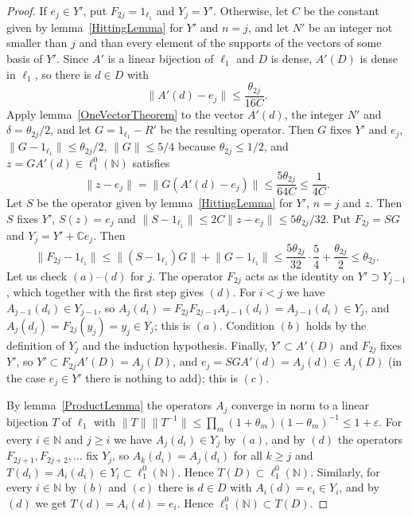 \documentclass[12pt]{article}
\newcommand{\lo}[1]{\ell_1^0(#1)}
\newcommand{\norm}[1]{\lVert #1\rVert}
\begin{document}
\begin{proof}
    If $e_j\in Y'$, put $F_{2j}=1_{\ell_1}$ and $Y_j=Y'$. Otherwise, let $C$
    be the constant given by lemma~\ref{HittingLemma} for $Y'$ and $n=j$, and
    let $N'$ be an integer not smaller than $j$ and than every element of the
    supports of the vectors of some basis of $Y'$. Since $A'$ is a linear
    bijection of $\ell_1$ and $D$ is dense, $A'(D)$ is dense in $\ell_1$, so
    there is $d\in D$ with
    \[
    \norm{A'(d)-e_j}\leq\frac{\theta_{2j}}{16C}.
    \]
    Apply lemma~\ref{OneVectorTheorem} to the vector $A'(d)$, the integer
    $N'$ and $\delta=\theta_{2j}/2$, and let $G=1_{\ell_1}-R'$ be the
    resulting operator. Then $G$ fixes $Y'$ and $e_j$,
    $\norm{G-1_{\ell_1}}\leq\theta_{2j}/2$, $\norm{G}\leq 5/4$ because
    $\theta_{2j}\leq 1/2$, and $z=GA'(d)\in\lo{\mathbb{N}}$ satisfies
    \[
    \norm{z-e_j}=\norm{G(A'(d)-e_j)}\leq\frac{5\theta_{2j}}{64C}\leq\frac{1}{4C}.
    \]
    Let $S$ be the operator given by lemma~\ref{HittingLemma} for $Y'$, $n=j$
    and $z$. Then $S$ fixes $Y'$, $S(z)=e_j$ and
    $\norm{S-1_{\ell_1}}\leq 2C\norm{z-e_j}\leq 5\theta_{2j}/32$. Put $F_{2j}=SG$
    and $Y_j=Y'+\mathbb{C}e_j$. Then
    \[
    \norm{F_{2j}-1_{\ell_1}}\leq\norm{(S-1_{\ell_1})G}+\norm{G-1_{\ell_1}}
    \leq\frac{5\theta_{2j}}{32}\cdot\frac54+\frac{\theta_{2j}}{2}
    \leq\theta_{2j}.
    \]
    Let us check $(a)$--$(d)$ for $j$. The operator $F_{2j}$ acts as the
    identity on $Y'\supset Y_{j-1}$, which together with the first step gives
    $(d)$. For $i<j$ we have $A_{j-1}(d_i)\in Y_{j-1}$, so
    $A_j(d_i)=F_{2j}F_{2j-1}A_{j-1}(d_i)=A_{j-1}(d_i)\in Y_j$, and
    $A_j(d_j)=F_{2j}(y_j)=y_j\in Y_j$; this is $(a)$. Condition $(b)$ holds
    by the definition of $Y_j$ and the induction hypothesis. Finally,
    $Y'\subset A'(D)$ and $F_{2j}$ fixes $Y'$, so $Y'\subset F_{2j}A'(D)=A_j(D)$,
    and $e_j=SGA'(d)=A_j(d)\in A_j(D)$ (in the case $e_j\in Y'$ there is
    nothing to add); this is $(c)$.

    By lemma~\ref{ProductLemma} the operators $A_j$ converge in norm to a
    linear bijection $T$ of $\ell_1$ with
    $\norm{T}\norm{T^{-1}}\leq\prod_m(1+\theta_m){(1-\theta_m)}^{-1}\leq
    1+\varepsilon$. For every $i\in\mathbb{N}$ and $j\geq i$ we have
    $A_j(d_i)\in Y_j$ by $(a)$, and by $(d)$ the operators $F_{2j+1},F_{2j+2},\ldots$
    fix $Y_j$, so $A_k(d_i)=A_j(d_i)$ for all $k\geq j$ and
    $T(d_i)=A_i(d_i)\in Y_i\subset\lo{\mathbb{N}}$. Hence
    $T(D)\subset\lo{\mathbb{N}}$. Similarly, for every $i\in\mathbb{N}$ by
    $(b)$ and $(c)$ there is $d\in D$ with $A_i(d)=e_i\in Y_i$, and by $(d)$
    we get $T(d)=A_i(d)=e_i$. Hence $\lo{\mathbb{N}}\subset T(D)$.
\end{proof}
\end{document}
